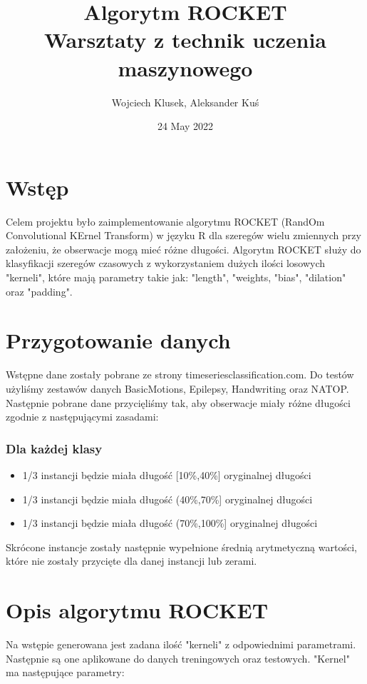 \documentclass[12pt]{article}
\title {Algorytm ROCKET \\[1ex] \large Warsztaty z technik uczenia maszynowego}
\author{Wojciech Klusek, Aleksander Kuś}
\date{24 May 2022}
\begin{document}
\maketitle

\section{Wstęp}
Celem projektu było zaimplementowanie algorytmu ROCKET (RandOm Convolutional KErnel Transform) w języku R dla szeregów wielu zmiennych przy założeniu, że obserwacje mogą mieć różne długości. Algorytm ROCKET służy do klasyfikacji szeregów czasowych z wykorzystaniem dużych ilości losowych "kerneli", które mają parametry takie jak: "length", "weights, "bias", "dilation" oraz "padding".

\section{Przygotowanie danych}
Wstępne dane zostały pobrane ze strony timeseriesclassification.com. Do testów użyliśmy zestawów danych BasicMotions, Epilepsy, Handwriting oraz NATOP. Następnie pobrane dane przycięliśmy tak, aby obserwacje miały różne długości zgodnie z następującymi zasadami: 

\subsubsection*{Dla każdej klasy}
\begin{itemize}
  \item 1/3 instancji będzie miała długość [10\%,40\%] oryginalnej długości
  \item 1/3 instancji będzie miała długość (40\%,70\%] oryginalnej długości
  \item 1/3 instancji będzie miała długość (70\%,100\%] oryginalnej długości
\end{itemize}

Skrócone instancje zostały następnie wypełnione średnią arytmetyczną wartości, które nie zostały przycięte dla danej instancji lub zerami.

\section{Opis algorytmu ROCKET}
Na wstępie generowana jest zadana ilość "kerneli" z odpowiednimi parametrami. Następnie są one aplikowane do danych treningowych oraz testowych. "Kernel" ma następujące parametry:
\end{document}
